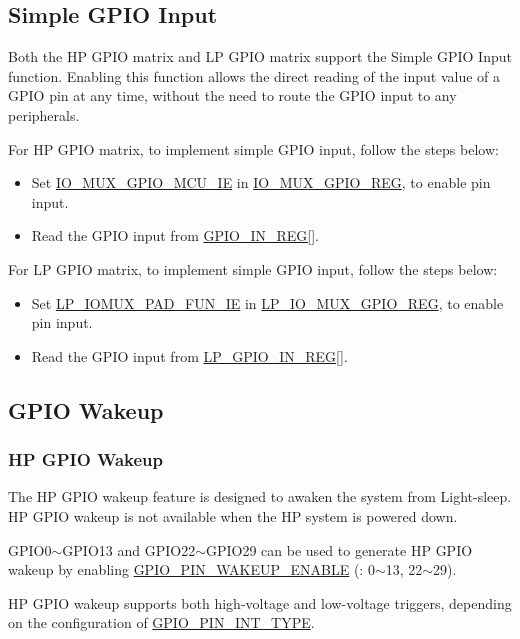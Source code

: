 \documentclass[main\_\_EN.tex]{subfiles}
\begin{document}
\subsection{Simple GPIO Input}

Both the HP GPIO matrix and LP GPIO matrix support the Simple GPIO Input function. Enabling this function allows the direct reading of the input value of a GPIO pin at any time, without the need to route the GPIO input to any peripherals.

For HP GPIO matrix, to implement simple GPIO input, follow the steps below:
\begin{itemize}
    \item Set \hyperref[fielddesc:IOMUXGPIONMCUIE] {IO\_MUX\_GPIO\_MCU\_IE} in \hyperref[regdesc:IOMUXGPIONREG]{IO\_MUX\_GPIO\_REG}, to enable pin input.
    \item Read the GPIO input from  \hyperref[regdesc:GPIOINREG]{GPIO\_IN\_REG[]}.
\end{itemize}

For LP GPIO matrix, to implement simple GPIO input, follow the steps below:
\begin{itemize}
    \item Set \hyperref[fielddesc:LPIOMUXGPIONFUNIE] {LP\_IOMUX\_PAD\_FUN\_IE} in \hyperref[regdesc:LPIOMUXGPIONREG]{LP\_IO\_MUX\_GPIO\_REG}, to enable pin input.
    \item Read the GPIO input from  \hyperref[regdesc:LPGPIOINREG]{LP\_GPIO\_IN\_REG[]}.
\end{itemize}


\subsection{GPIO Wakeup}

\subsubsection{HP GPIO Wakeup}
    The HP GPIO wakeup feature is designed to awaken the system from Light-sleep. HP GPIO wakeup is not available when the HP system is powered down.

    GPIO0$\sim$GPIO13 and GPIO22$\sim$GPIO29 can be used to generate HP GPIO wakeup by enabling \hyperref[fielddesc:GPIOPINNWAKEUPENABLE]{GPIO\_PIN\_WAKEUP\_ENABLE} (: 0$\sim$13, 22$\sim$29).

    HP GPIO wakeup supports both high-voltage and low-voltage triggers, depending on the configuration of \hyperref[fielddesc:GPIOPINNINTTYPE] {GPIO\_PIN\_INT\_TYPE}.
\end{document}
